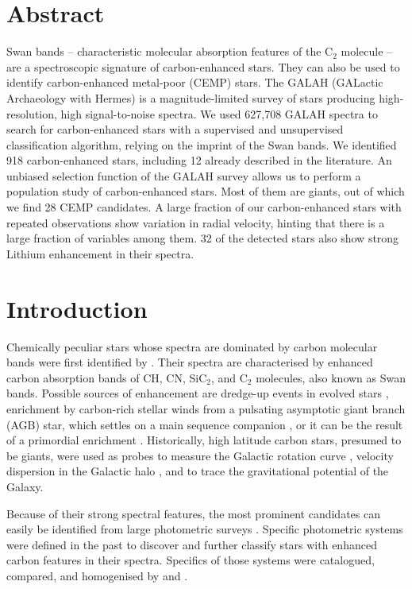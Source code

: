 
\section{Abstract}
	Swan bands  -- characteristic molecular absorption features of the C$_2$ molecule -- are a spectroscopic signature of carbon-enhanced stars. They can also be used to identify carbon-enhanced metal-poor (CEMP) stars. The GALAH (GALactic Archaeology with Hermes) is a magnitude-limited survey of stars producing high-resolution, high signal-to-noise spectra. We used 627,708 GALAH spectra to search for carbon-enhanced stars with a supervised and unsupervised classification algorithm, relying on the imprint of the Swan bands. We identified 918 carbon-enhanced stars, including 12 already described in the literature. An unbiased selection function of the GALAH survey allows us to perform a population study of carbon-enhanced stars. Most of them are giants, out of which we find 28 CEMP candidates. A large fraction of our carbon-enhanced stars with repeated observations show variation in radial velocity, hinting that there is a large fraction of variables among them. 32 of the detected stars also show strong Lithium enhancement in their spectra.

\section{Introduction}
Chemically peculiar stars whose spectra are dominated by carbon molecular bands were first identified by \citet{1869AN.....73..129S}. Their spectra are characterised by enhanced carbon absorption bands of CH, CN, SiC$_2$, and C$_{2}$ molecules, also known as Swan bands. Possible sources of enhancement are dredge-up events in evolved stars \citep{1983ApJ...275L..65I}, enrichment by carbon-rich stellar winds from a pulsating asymptotic giant branch (AGB) star, which settles on a main sequence companion \citep{1995MNRAS.277.1443H}, or it can be the result of a primordial enrichment \citep{2016ApJ...833...20Y}. Historically, high latitude carbon stars, presumed to be giants, were used as probes to measure the Galactic rotation curve \citep{2013Ap.....56...68B}, velocity dispersion in the Galactic halo \citep{1991AJ....101.2220B}, and to trace the gravitational potential of the Galaxy.  

Because of their strong spectral features, the most prominent candidates can easily be identified from large photometric surveys \citep{2002AJ....124.1651M, 2004AJ....127.2838D}. Specific photometric systems \citep{1960MNRAS.120..287G, 1968AJ.....73..313M, 1970A&AS....1..199H} were defined in the past to discover and further classify stars with enhanced carbon features in their spectra. Specifics of those systems were catalogued, compared, and homogenised by \citet{2000A&AS..147..361M} and \citet{2003A&A...401..781F}.

